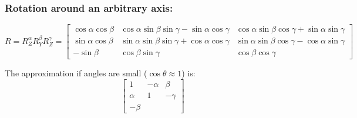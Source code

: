 \documentclass{article}
\begin{document}
\subsubsection*{Rotation around an arbitrary axis:}
\[R=R_Z^\alpha R_Y^\beta R_Z^\gamma=\begin{bmatrix}
    \cos\alpha\cos\beta & \cos\alpha\sin\beta\sin\gamma - \sin\alpha\cos\gamma & \cos\alpha\sin\beta\cos\gamma + \sin\alpha\sin\gamma \\
    \sin\alpha\cos\beta & \sin\alpha\sin\beta\sin\gamma + \cos\alpha\cos\gamma & \sin\alpha\sin\beta\cos\gamma - \cos\alpha\sin\gamma \\
    -\sin\beta & \cos\beta\sin\gamma & \cos\beta\cos\gamma
\end{bmatrix}\]

The approximation if angles are small ($\cos\theta \approx 1$) is:
\[\begin{bmatrix}
    1 & -\alpha & \beta \\
    \alpha & 1 & -\gamma \\
    -\beta
\end{bmatrix}\]
\end{document}
